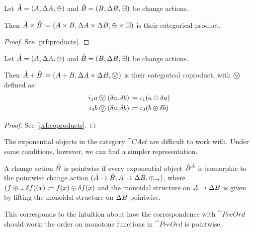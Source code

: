 \begin{prop}[name=Products, restate=products]
  \label{prop:products}
  Let $\cstr{A} = \cstruct{A}{\changes{A}}{\cplus}$ and $\cstr{B} =
  \cstruct{B}{\changes{B}}{\cpluss}$ be change actions.

  Then $\cstr{A} \times \cstr{B} \defeq \cstruct{A \times B}{\changes{A} \times
  \changes{B}}{\cplus \times \cpluss}$ is their categorical product.
\end{prop}
\ifproofs
\begin{proof}
  See \cref{prf:products}.
\end{proof}
\fi

\begin{prop}[name=Coproducts, restate=coproducts]
  \label{prop:coproducts}
  Let $\cstr{A} = \cstruct{A}{\changes{A}}{\cplus}$ and $\cstr{B} =
  \cstruct{B}{\changes{B}}{\cpluss}$ be change actions.

  Then $\cstr{A} + \cstr{B} \defeq \cstruct{A + B}{\changes{A} \times
  \changes{B}}{\cplusvee}$ is their categorical coproduct, with $\cplusvee$ defined as:
  \begin{align*}
    i_1 a \cplusvee (\change{a}, \change{b}) &\defeq \iota_1 (a \cplus \change{a})\\
    i_2 b \cplusvee (\change{a}, \change{b}) &\defeq \iota_2 (b \cplus \change{b})
  \end{align*}
\end{prop}
\ifproofs
\begin{proof}
  See \cref{prf:coproducts}.
\end{proof}
\fi

The exponential objects in the category $\cat{CAct}$ are difficult to work with. Under some
conditions, however, we can find a simpler representation.

\begin{defn}
  \label{def:pointwiseChanges}
  A change action $\cstr{B}$ is pointwise if every exponential object
  $\exponential{\cstr{A}}{\cstr{B}}$ is isomorphic to the pointwise change action
  $\cstruct{\cstr{A} \rightarrow \cstr{B}}{A \rightarrow \changes{B}}{\cplus_\rightarrow}$,
  where $(f \cplus_\rightarrow \change{f})(x) \defeq f(x) \cplus \change{f}(x)$ and the
  monoidal structure on $A \rightarrow \changes{B}$ is given by lifting
  the monoidal structure on $\changes{B}$ pointwise.
\end{defn}

This corresponds to the intuition about how the correspondence with
$\cat{PreOrd}$ should work: the order on monotone functions in $\cat{PreOrd}$ is
pointwise.

